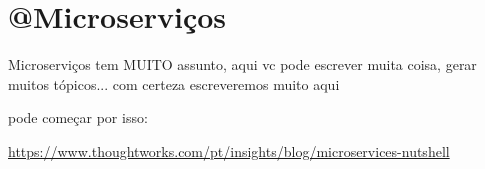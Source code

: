 \chapter{@Microserviços}

Microserviços tem MUITO assunto, aqui vc pode escrever muita coisa,
gerar muitos tópicos... com certeza escreveremos muito aqui

pode começar por isso:

\url{https://www.thoughtworks.com/pt/insights/blog/microservices-nutshell}
